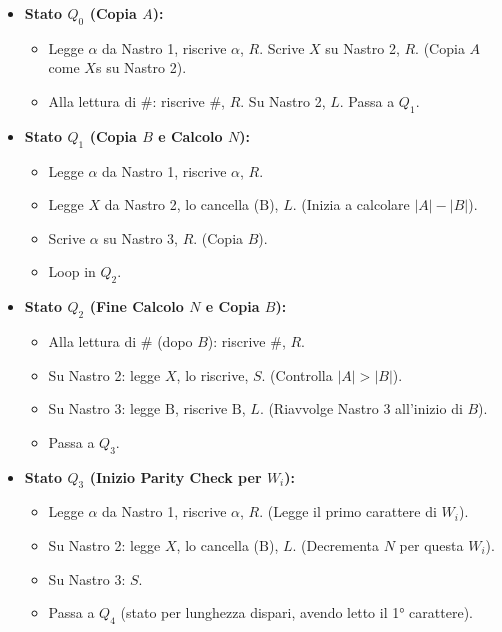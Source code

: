 \documentclass[a4paper]{article}
\newcommand{\B}{\text{B}} %
\begin{document}
\begin{itemize}
    \item \textbf{Stato $Q_0$ (Copia $A$):}
        \begin{itemize}
            \item Legge $\alpha$ da Nastro 1, riscrive $\alpha$, $R$. Scrive $X$ su Nastro 2, $R$. (Copia $A$ come $X$s su Nastro 2).
            \item Alla lettura di $\#$: riscrive $\#$, $R$. Su Nastro 2, $L$. Passa a $Q_1$.
        \end{itemize}
    \item \textbf{Stato $Q_1$ (Copia $B$ e Calcolo $N$):}
        \begin{itemize}
            \item Legge $\alpha$ da Nastro 1, riscrive $\alpha$, $R$.
            \item Legge $X$ da Nastro 2, lo cancella ($\B$), $L$. (Inizia a calcolare $|A|-|B|$).
            \item Scrive $\alpha$ su Nastro 3, $R$. (Copia $B$).
            \item Loop in $Q_2$.
        \end{itemize}
    \item \textbf{Stato $Q_2$ (Fine Calcolo $N$ e Copia $B$):}
        \begin{itemize}
            \item Alla lettura di $\#$ (dopo $B$): riscrive $\#$, $R$.
            \item Su Nastro 2: legge $X$, lo riscrive, $S$. (Controlla $|A|>|B|$).
            \item Su Nastro 3: legge $\B$, riscrive $\B$, $L$. (Riavvolge Nastro 3 all'inizio di $B$).
            \item Passa a $Q_3$.
        \end{itemize}
    \item \textbf{Stato $Q_3$ (Inizio Parity Check per $W_i$):}
        \begin{itemize}
            \item Legge $\alpha$ da Nastro 1, riscrive $\alpha$, $R$. (Legge il primo carattere di $W_i$).
            \item Su Nastro 2: legge $X$, lo cancella ($\B$), $L$. (Decrementa $N$ per questa $W_i$).
            \item Su Nastro 3: $S$.
            \item Passa a $Q_4$ (stato per lunghezza dispari, avendo letto il 1° carattere).
        \end{itemize}

\end{itemize}
\end{document}

